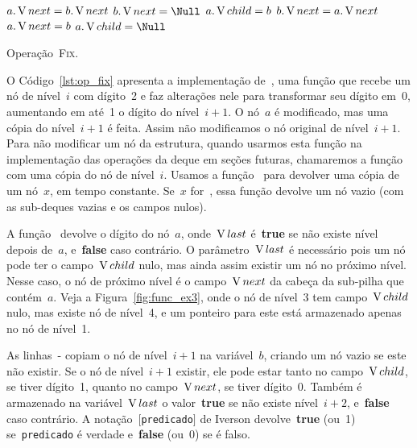 \documentclass[../../main.tex]{subfiles}
\begin{document}
\begin{algorithm}
\begin{algorithmic}[1]
          \label{line:fix:next_a_bb}
            \State $a.\operatorname{V}{next} = b.\operatorname{V}{next}$
            \State $b.\V{next} = \Null$ \label{line:fix:next_a_be}
        \EndIf
        \State $a.\operatorname{V}{child} = b$ \label{line:fix:child_a_b}
    \Else
         \label{line:fix:next_b_ab}
            \State $b.\operatorname{V}{next} = a.\operatorname{V}{next}$  \label{line:fix:next_b_ae}
        \EndIf
        \State $a.\operatorname{V}{next} = b$ \label{line:fix:child_b_ab}
        \State $a.\V{child} = \Null$  \label{line:fix:child_b_ae}
    \EndIf
\EndFunction

\end{algorithmic}
\caption{Operação~\textsc{Fix}.} \label{lst:op_fix}
\end{algorithm}

O Código~\ref{lst:op_fix} apresenta a implementação de~, uma função que recebe um nó de nível~$i$ com dígito~2 e faz alterações nele para transformar seu dígito em~0, aumentando em até~1 o dígito do nível~$i+1$. O nó~$a$ é modificado, mas uma cópia do nível~$i+1$ é feita. Assim não modificamos o nó original de nível~$i+1$. Para não modificar um nó da estrutura, quando usarmos esta função na implementação das operações da deque em seções futuras, chamaremos a função com uma cópia do nó de nível~$i$. Usamos a função~ para devolver uma cópia de um nó~$x$, em tempo constante. Se~$x$ for~, essa função devolve um nó vazio (com as sub-deques vazias e os campos nulos).

A função~ devolve o dígito do nó~$a$, onde~$\operatorname{V}{last}$ é~\textbf{true} se não existe nível depois de~$a$, e~\textbf{false} caso contrário. O parâmetro~$\operatorname{V}{last}$ é necessário pois um nó pode ter o campo~$\operatorname{V}{child}$ nulo, mas ainda assim existir um nó no próximo nível. Nesse caso, o nó de próximo nível é o campo~$\operatorname{V}{next}$ da cabeça da sub-pilha que contém~$a$. Veja a Figura~\ref{fig:func_ex3}, onde o nó de nível~3 tem campo~$\operatorname{V}{child}$ nulo, mas existe nó de nível~4, e um ponteiro para este está armazenado apenas no nó de nível~1.

As linhas~{-} copiam o nó de nível~$i+1$ na variável~$b$, criando um nó vazio se este não existir. Se o nó de nível~${i+1}$ existir, ele pode estar tanto no campo~$\operatorname{V}{child}$, se tiver dígito~1, quanto no campo~$\operatorname{V}{next}$, se tiver dígito~0.
Também é armazenado na variável~$\operatorname{V}{last}$ o valor~\textbf{true} se não existe nível~$i+2$, e~\textbf{false} caso contrário. A notação~$[$\texttt{predicado}$]$ de Iverson devolve~\textbf{true} (ou~1) se~\texttt{predicado} é verdade e~\textbf{false} (ou~0) se é falso.
\end{document}
